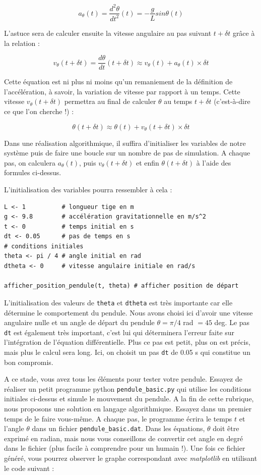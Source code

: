 \documentclass[a4paper,11pt,twoside]{book}
\begin{document}
\[a_{\theta}(t) = \frac{d^2 \theta}{dt^2}(t) = - \frac{g}{L} sin \theta(t)\]

L'astuce sera de calculer ensuite la vitesse angulaire au pas suivant
\(t + \delta t\) grâce à la relation :

\[v_{\theta}(t+\delta t) = \frac{d\theta}{dt}(t+\delta t) \approx v_{\theta}(t) + a_{\theta}(t) \times \delta t\]

Cette équation est ni plus ni moins qu'un remaniement de la définition
de l'accélération, à savoir, la variation de vitesse par rapport à un
temps. Cette vitesse \(v_{\theta}(t+\delta t)\) permettra au final de
calculer \(\theta\) au temps \(t + \delta t\) (c'est-à-dire ce que l'on
cherche !) :

\[\theta (t + \delta t) \approx \theta (t) + v_{\theta}(t+\delta t) \times \delta t\]

Dans une réalisation algorithmique, il suffira d'initialiser les
variables de notre système puis de faire une boucle sur un nombre de pas
de simulation. A chaque pas, on calculera \(a_{\theta}(t)\), puis
\(v_{\theta}(t+\delta t)\) et enfin \(\theta (t + \delta t)\) à l'aide
des formules ci-dessus.

L'initialisation des variables pourra ressembler à cela :

\begin{verbatim}
L <- 1          # longueur tige en m
g <- 9.8        # accélération gravitationnelle en m/s^2
t <- 0          # temps initial en s
dt <- 0.05      # pas de temps en s
# conditions initiales
theta <- pi / 4 # angle initial en rad
dtheta <- 0     # vitesse angulaire initiale en rad/s

afficher_position_pendule(t, theta) # afficher position de départ
\end{verbatim}

L'initialisation des valeurs de \texttt{theta} et \texttt{dtheta} est
très importante car elle détermine le comportement du pendule. Nous
avons choisi ici d'avoir une vitesse angulaire nulle et un angle de
départ du pendule \(\theta = \pi / 4\) rad \(= 45\) deg. Le pas
\texttt{dt} est également très important, c'est lui qui déterminera
l'erreur faite sur l'intégration de l'équation différentielle. Plus ce
pas est petit, plus on est précis, mais plus le calcul sera long. Ici,
on choisit un pas \texttt{dt} de 0.05 s qui constitue un bon compromis.

A ce stade, vous avez tous les éléments pour tester votre pendule.
Essayez de réaliser un petit programme python \texttt{pendule\_basic.py}
qui utilise les conditions initiales ci-dessus et simule le mouvement du
pendule. A la fin de cette rubrique, nous proposons une solution en
langage algorithmique. Essayez dans un premier temps de le faire
vous-même. A chaque pas, le programme écrira le temps \(t\) et l'angle
\(\theta\) dans un fichier \texttt{pendule\_basic.dat}. Dans les
équations, \(\theta\) doit être exprimé en radian, mais nous vous
conseillons de convertir cet angle en degré dans le fichier (plus facile
à comprendre pour un humain !). Une fois ce fichier généré, vous pourrez
observer le graphe correspondant avec \emph{matplotlib} en utilisant le
code suivant :
\end{document}
